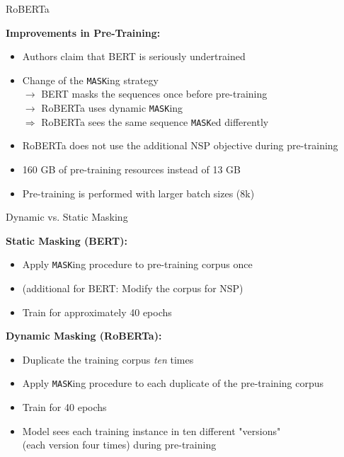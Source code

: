 \begin{frame}{RoBERTa}

\vspace{1cm}

	\textbf{Improvements in Pre-Training:}

	\begin{itemize}
		\item Authors claim that BERT is seriously undertrained
		\item Change of the \texttt{MASK}ing strategy  \\
					$\rightarrow$ BERT masks the sequences once before pre-training  \\
					$\rightarrow$ RoBERTa uses dynamic \texttt{MASK}ing  \\
					$\Rightarrow$ RoBERTa sees the same sequence \texttt{MASK}ed differently
		\item RoBERTa does not use the additional NSP objective during pre-training
		\item 160 GB of pre-training resources instead of 13 GB
		\item Pre-training is performed with larger batch sizes (8k)
	\end{itemize}
\end{frame}


\begin{frame}{Dynamic vs. Static Masking \href{https://arxiv.org/pdf/1907.11692.pdf}{}}

	\textbf{Static Masking (BERT):}

	\begin{itemize}
		\item Apply \texttt{MASK}ing procedure to pre-training corpus once
		\item (additional for BERT: Modify the corpus for NSP)
		\item Train for approximately 40 epochs
	\end{itemize}

\vspace{.3cm}

	\textbf{Dynamic Masking (RoBERTa):}

	\begin{itemize}
		\item Duplicate the training corpus \textit{ten} times
		\item Apply \texttt{MASK}ing procedure to each duplicate of the pre-training corpus
		\item Train for 40 epochs
		\item Model sees each training instance in ten different "versions"\\
					(each version four times) during pre-training
	\end{itemize}
\end{frame}


\endlecture

